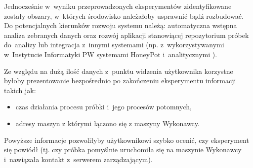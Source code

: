 \documentclass[a4paper,12pt,oneside]{article}
\begin{document}
	Jednocześnie w~wyniku przeprowadzonych eksperymentów zidentyfikowane zostały obszary, w~których środowisko należałoby usprawnić bądź rozbudować. Do potencjalnych kierunków rozwoju systemu należą: automatyczna wstępna analiza zebranych danych oraz rozwój aplikacji stanowiącej repozytorium próbek do~analizy lub integracja z~innymi systemami (np. z~wykorzystywanymi w~Instytucie Informatyki PW systemami HoneyPot i~analitycznymi \cite{qnap-malware, honeypots}).
		
	Ze względu na dużą ilość danych z~punktu widzenia użytkownika korzystne byłoby prezentowanie bezpośrednio po zakończeniu eksperymentu informacji takich jak:
	
	\begin{itemize}
		\item czas działania procesu próbki i~jego procesów potomnych,
		\item adresy maszyn z którymi łączono się z maszyny Wykonawcy.
	\end{itemize} 
	
	Powyższe informacje pozwoliłyby użytkownikowi szybko ocenić, czy eksperyment się powiódł (tj. czy próbka pomyślnie uruchomiła się na maszynie Wykonawcy i~nawiązała kontakt z~serwerem zarządzającym).
			
\end{document}
